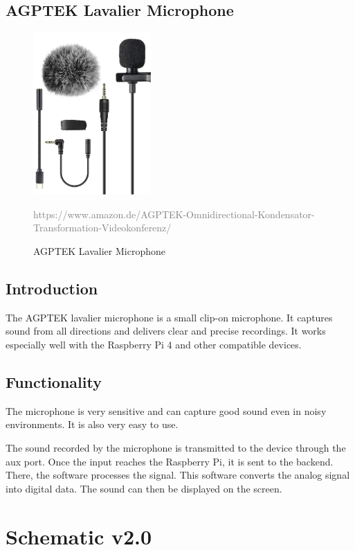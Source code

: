 \newpage

\subsection{AGPTEK Lavalier Microphone}

\begin{figure}[h]
\centering
\includegraphics[width=0.4\textwidth]{assets/Mikrofon(1)}
\caption{AGPTEK Lavalier Microphone}
\textcolor{gray}{https://www.amazon.de/AGPTEK-Omnidirectional-Kondensator-Transformation-Videokonferenz/}
\label{fig:AGPTEK Microphone}
\end{figure}

\subsection*{Introduction}
The AGPTEK lavalier microphone is a small clip-on microphone. It captures sound from all directions and delivers clear and precise recordings. It works especially well with the Raspberry Pi 4 and other compatible devices.

\subsection*{Functionality}
The microphone is very sensitive and can capture good sound even in noisy environments. It is also very easy to use.

The sound recorded by the microphone is transmitted to the device through the aux port. Once the input reaches the Raspberry Pi, it is sent to the backend. There, the software processes the signal. This software converts the analog signal into digital data. The sound can then be displayed on the screen.


\newpage


\section{Schematic v2.0}

